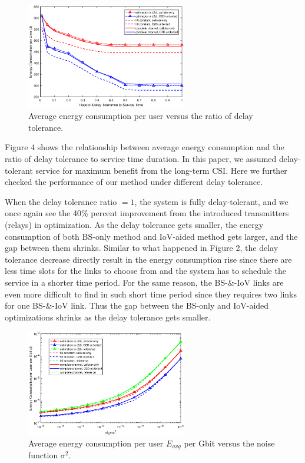 \documentclass[conference]{IEEEtran}
\begin{document}
\begin{figure} [htb]
\begin{center}
\includegraphics*[width=7cm]{delays.eps}
\end{center}
\vspace*{-4mm} 
\caption{Average energy consumption per user versus the ratio of delay tolerance.} \label{fig:4}
\vspace*{-2mm} 
\end{figure}

Figure 4 shows the relationship between average energy consumption and the ratio of delay tolerance to service time duration. In this paper, we assumed delay-tolerant service for maximum benefit from the long-term CSI. Here we further checked the performance of our method under different delay tolerance.

When the delay tolerance ratio $= 1$, the system is fully delay-tolerant, and we once again see the 40\% percent improvement from the introduced transmitters (relays) in optimization. As the delay tolerance gets smaller, the energy consumption of both BS-only method and IoV-aided method gets larger, and the gap between them shrinks. Similar to what happened in Figure 2, the delay tolerance decrease %
directly result in the energy consumption rise since there are less time slots for the links to choose from and the system has to schedule the service in a shorter time period. For the same reason, the BS-\&-IoV links are even more difficult to find in such short time period since they requires two links for one BS-\&-IoV link. Thus the gap between the BS-only and IoV-aided optimizations shrinks as the delay tolerance gets smaller. 

\begin{figure} [htb]
\begin{center}
\includegraphics*[width=7cm]{sigma2s.eps}
\end{center}
\vspace*{-4mm} 
\caption{Average energy consumption per user $E_{avg}$ per Gbit versus the noise function ${\sigma ^2}$.}\label{fig:5}
\vspace*{-2mm} 
\end{figure}
\end{document}

